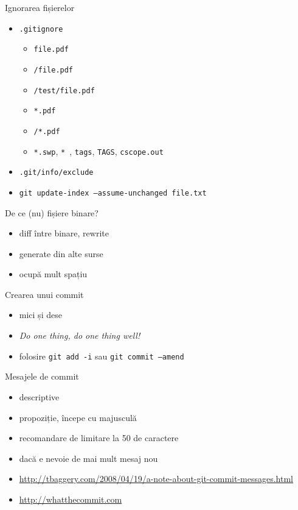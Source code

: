 \documentclass{beamer}
\begin{document}
\begin{frame}{Ignorarea fișierelor}
  \begin{itemize}
    \item \texttt{.gitignore}
      \begin{itemize}
	\item \texttt{file.pdf}
	\item \texttt{/file.pdf}
	\item \texttt{/test/file.pdf}
	\item \texttt{*.pdf}
	\item \texttt{/*.pdf}
	\item \texttt{*.swp}, \texttt{*~}, \texttt{tags}, \texttt{TAGS},
	  \texttt{cscope.out}
      \end{itemize}
    \item \texttt{.git/info/exclude}
    \item \texttt{git update-index --assume-unchanged file.txt}
  \end{itemize}
\end{frame}

\begin{frame}{De ce (nu) fișiere binare?}
  \begin{itemize}
    \item diff între binare, rewrite
    \item generate din alte surse
    \item ocupă mult spațiu
  \end{itemize}
\end{frame}

\begin{frame}{Crearea unui commit}
  \begin{itemize}
    \item mici și dese
    \item \textit{Do one thing, do one thing well!}
    \item folosire \texttt{git add -i} sau \texttt{git commit --amend}
  \end{itemize}
\end{frame}

\begin{frame}{Mesajele de commit}
  \begin{itemize}
    \item descriptive
    \item propoziție, începe cu majusculă
    \item recomandare de limitare la 50 de caractere
    \item dacă e nevoie de mai mult mesaj nou
    \item
      \url{http://tbaggery.com/2008/04/19/a-note-about-git-commit-messages.html}
    \item \url{http://whatthecommit.com}
  \end{itemize}
\end{frame}
\end{document}
